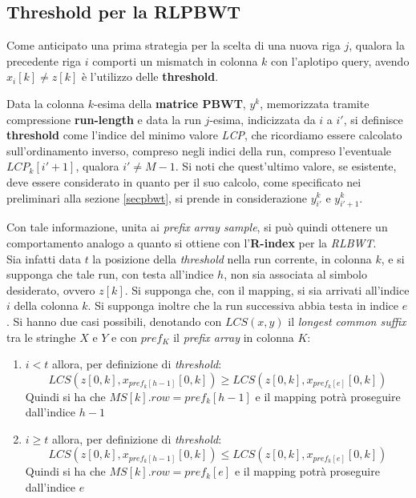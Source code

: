 \subsection{Threshold per la RLPBWT}
Come anticipato una prima strategia per la scelta di una nuova riga $j$, qualora
la precedente riga $i$ comporti un mismatch in colonna $k$ con l'aplotipo query,
avendo $x_i[k]\neq z[k]$ è l'utilizzo delle \textbf{threshold}.
\begin{definizione}
  Data la colonna $k$-esima della \textbf{matrice PBWT}, $y^k$, memorizzata
  tramite compressione \textbf{run-length} e data la run $j$-esima, indicizzata
  da $i$ a $i'$, si definisce \textbf{threshold} come l'indice del minimo valore
  \textit{LCP}, che ricordiamo essere calcolato sull'ordinamento inverso,
  compreso negli indici della run, compreso l'eventuale 
  $LCP_k[i'+1]$, qualora $i'\neq M-1$. Si noti che quest'ultimo valore, se
  esistente, deve essere considerato in quanto per il suo calcolo, come
  specificato nei preliminari alla sezione \ref{secpbwt}, si prende in
  considerazione $y^k_{i'}$ e $y^k_{i'+1}$.
\end{definizione}
Con tale informazione, unita ai \textit{prefix array sample}, si può quindi
ottenere un comportamento analogo a quanto si ottiene con l'\textbf{R-index} per
la \textit{RLBWT}.\\
Sia infatti data $t$ la posizione della \textit{threshold} nella run corrente,
in colonna $k$, e
si supponga che tale run, con testa all'indice $h$, non sia associata al simbolo
desiderato, ovvero $z[k]$. Si supponga che, con il mapping, si sia arrivati
all'indice $i$ della colonna $k$. Si supponga inoltre che la run successiva
abbia testa in indice $e$. Si hanno due casi possibili, denotando con
$LCS(x,y)$ il \textit{longest common suffix} tra le stringhe $X$ e $Y$ e con
$pref_K$ il \textit{prefix array} in colonna $K$:
\begin{enumerate}
  \item $i<t$ allora, per definizione di \textit{threshold}:
  \[LCS(z[0,k], x_{pref_{k}[h-1]}[0,k])\geq LCS(z[0,k], x_{pref_{k}[e]}[0,k])\]
  Quindi si ha che $MS[k].row=pref_{k}[h-1]$ e il mapping potrà proseguire
  dall'indice $h-1$
  \item  $i\geq t$ allora, per definizione di \textit{threshold}:
  \[LCS(z[0,k], x_{pref_{k}[h-1]}[0,k])\leq LCS(z[0,k], x_{pref_{k}[e]}[0,k])\]
  Quindi si ha che $MS[k].row=pref_{k}[e]$ e il mapping potrà proseguire
  dall'indice $e$
\end{enumerate}




